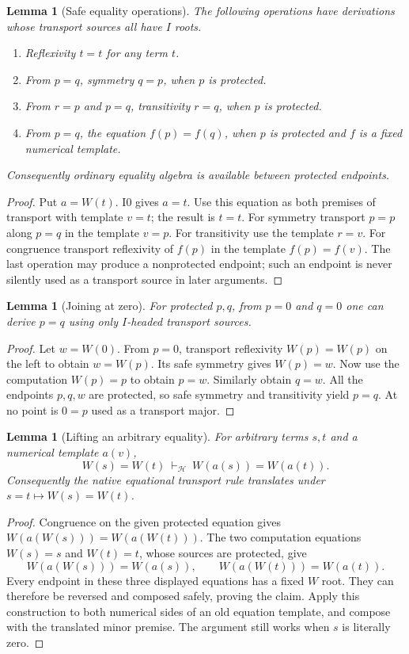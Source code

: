 \documentclass[11pt,letterpaper]{article}
\newtheorem{lemma}[theorem]{Lemma}
\theoremstyle{definition}\newtheorem{definition}[theorem]{Definition}
\theoremstyle{remark}\newtheorem{remark}[theorem]{Remark}
\newcommand{\Hcal}{\mathcal H}\newcommand{\Kcal}{\mathcal K}
\begin{document}
\begin{lemma}[Safe equality operations]\label{lem:safe}
The following operations have derivations whose transport sources all
have \(I\) roots.
\begin{enumerate}
\item Reflexivity \(t=t\) for any term \(t\).
\item From \(p=q\), symmetry \(q=p\), when \(p\) is protected.
\item From \(r=p\) and \(p=q\), transitivity \(r=q\), when \(p\)
is protected.
\item From \(p=q\), the equation \(f(p)=f(q)\), when \(p\) is
protected and \(f\) is a fixed numerical template.
\end{enumerate}
Consequently ordinary equality algebra is available between protected
endpoints.
\end{lemma}
\begin{proof}
Put \(a=W(t)\). I0 gives \(a=t\). Use this equation as both
premises of transport with template \(v=t\); the result is \(t=t\).
For symmetry transport \(p=p\) along \(p=q\) in the template
\(v=p\). For transitivity use the template \(r=v\). For congruence
transport reflexivity of \(f(p)\) in the template \(f(p)=f(v)\).
The last operation may produce a nonprotected endpoint; such an
endpoint is never silently used as a transport source in later
arguments.
\end{proof}

\begin{lemma}[Joining at zero]\label{lem:zerojoin}
For protected \(p,q\), from \(p=0\) and \(q=0\) one can derive
\(p=q\) using only \(I\)-headed transport sources.
\end{lemma}
\begin{proof}
Let \(w=W(0)\). From \(p=0\), transport reflexivity
\(W(p)=W(p)\) on the left to obtain \(w=W(p)\).
Its safe symmetry gives \(W(p)=w\). Now use the computation
\(W(p)=p\) to obtain \(p=w\). Similarly obtain \(q=w\).
All the endpoints \(p,q,w\) are protected, so safe symmetry and
transitivity yield \(p=q\). At no point is \(0=p\) used as a
transport major.
\end{proof}

\begin{lemma}[Lifting an arbitrary equality]\label{lem:lift}
For arbitrary terms \(s,t\) and a numerical template \(a(v)\),
\[
 W(s)=W(t)\ \vdash_{\Hcal}\ W(a(s))=W(a(t)).
\]
Consequently the native equational transport rule translates under
\(s=t\mapsto W(s)=W(t)\).
\end{lemma}
\begin{proof}
Congruence on the given protected equation gives
\(W(a(W(s)))=W(a(W(t)))\). The two computation equations
\(W(s)=s\) and \(W(t)=t\), whose sources are protected, give
\[
 W(a(W(s)))=W(a(s)),\qquad
 W(a(W(t)))=W(a(t)).
\]
Every endpoint in these three displayed equations has a fixed \(W\)
root. They can therefore be reversed and composed safely, proving
the claim. Apply this construction to both numerical sides of an old
equation template, and compose with the translated minor premise.
The argument still works when \(s\) is literally zero.
\end{proof}
\end{document}
